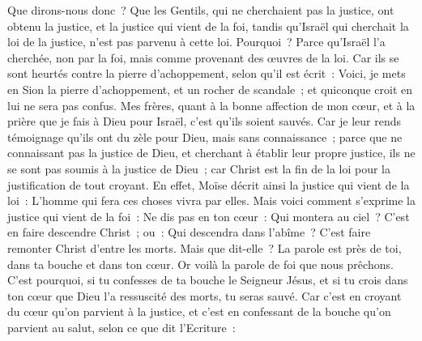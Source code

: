 \begin{multicols}{2}
Que dirons-nous donc~? Que les Gentils, qui ne cherchaient pas la justice, ont obtenu la justice, et la justice qui vient de la foi,
tandis qu'Israël qui cherchait la loi de la justice, n'est pas parvenu à cette loi.
Pourquoi~? Parce qu'Israël l'a cherchée, non par la foi, mais comme provenant des œuvres de la loi. Car ils se sont heurtés contre la pierre d'achoppement,
selon qu'il est écrit~: Voici, je mets en Sion la pierre d'achoppement, et un rocher de scandale~; et quiconque croit en lui ne sera pas confus.
\VerseOne{}Mes frères, quant à la bonne affection de mon cœur, et à la prière que je fais à Dieu pour Israël, c'est qu'ils soient sauvés.
Car je leur rends témoignage qu'ils ont du zèle pour Dieu, mais sans connaissance~;
parce que ne connaissant pas la justice de Dieu, et cherchant à établir leur propre justice, ils ne se sont pas soumis à la justice de Dieu~;
car Christ est la fin de la loi pour la justification de tout croyant.
En effet, Moïse décrit ainsi la justice qui vient de la loi~: L'homme qui fera ces choses vivra par elles.
Mais voici comment s'exprime la justice qui vient de la foi~: Ne dis pas en ton cœur~: Qui montera au ciel~? C'est en faire descendre Christ~;
ou~: Qui descendra dans l'abîme~? C'est faire remonter Christ d'entre les morts.
Mais que dit-elle~? La parole est près de toi, dans ta bouche et dans ton cœur. Or voilà la parole de foi que nous prêchons.
C'est pourquoi, si tu confesses de ta bouche le Seigneur Jésus, et si tu crois dans ton cœur que Dieu l'a ressuscité des morts, tu seras sauvé.
Car c'est en croyant du cœur qu'on parvient à la justice, et c'est en confessant de la bouche qu'on parvient au salut, selon ce que dit l'Ecriture~:

\end{multicols}
